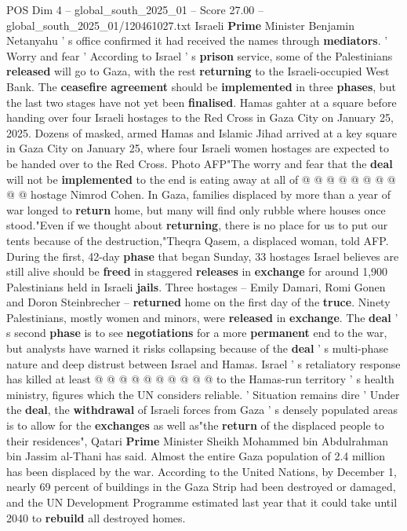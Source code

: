 \begin{textsample}{POS Dim 4 – global\_south\_2025\_01 – Score 27.00 – global\_south\_2025\_01/120461027.txt}
Israeli \textbf{Prime} Minister Benjamin Netanyahu ' s office confirmed it had received the names through \textbf{mediators}. ' Worry and fear ' According to Israel ' s \textbf{prison} service, some of the Palestinians \textbf{released} will go to Gaza, with the rest \textbf{returning} to the Israeli-occupied West Bank.
The \textbf{ceasefire} \textbf{agreement} should be \textbf{implemented} in three \textbf{phases}, but the last two stages have not yet been \textbf{finalised}.
Hamas gahter at a square before handing over four Israeli hostages to the Red Cross in Gaza City on January 25, 2025.
Dozens of masked, armed Hamas and Islamic Jihad arrived at a key square in Gaza City on January 25, where four Israeli women hostages are expected to be handed over to the Red Cross.
Photo AFP"The worry and fear that the \textbf{deal} will not be \textbf{implemented} to the end is eating away at all of @ @ @ @ @ @ @ @ @ @ hostage Nimrod Cohen.
In Gaza, families displaced by more than a year of war longed to \textbf{return} home, but many will find only rubble where houses once stood."Even if we thought about \textbf{returning}, there is no place for us to put our tents because of the destruction,"Theqra Qasem, a displaced woman, told AFP.
During the first, 42-day \textbf{phase} that began Sunday, 33 hostages Israel believes are still alive should be \textbf{freed} in staggered \textbf{releases} in \textbf{exchange} for around 1,900 Palestinians held in Israeli \textbf{jails}.
Three hostages -- Emily Damari, Romi Gonen and Doron Steinbrecher -- \textbf{returned} home on the first day of the \textbf{truce}.
Ninety Palestinians, mostly women and minors, were \textbf{released} in \textbf{exchange}.
The \textbf{deal} ' s second \textbf{phase} is to see \textbf{negotiations} for a more \textbf{permanent} end to the war, but analysts have warned it risks collapsing because of the \textbf{deal} ' s multi-phase nature and deep distrust between Israel and Hamas.
Israel ' s retaliatory response has killed at least @ @ @ @ @ @ @ @ @ @ to the Hamas-run territory ' s health ministry, figures which the UN considers reliable. ' Situation remains dire ' Under the \textbf{deal}, the \textbf{withdrawal} of Israeli forces from Gaza ' s densely populated areas is to allow for the \textbf{exchanges} as well as"the \textbf{return} of the displaced people to their residences", Qatari \textbf{Prime} Minister Sheikh Mohammed bin Abdulrahman bin Jassim al-Thani has said.
Almost the entire Gaza population of 2.4 million has been displaced by the war.
According to the United Nations, by December 1, nearly 69 percent of buildings in the Gaza Strip had been destroyed or damaged, and the UN Development Programme estimated last year that it could take until 2040 to \textbf{rebuild} all destroyed homes.

\end{textsample}
